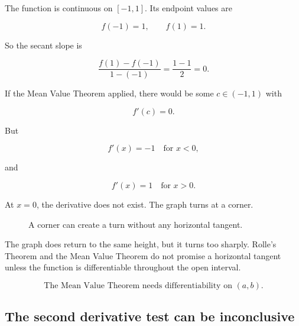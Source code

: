 The function is continuous on \([-1,1]\).  Its endpoint values are

\[
f(-1)=1,
\qquad
f(1)=1.
\]

So the secant slope is

\[
\frac{f(1)-f(-1)}{1-(-1)}
=
\frac{1-1}{2}
=
0.
\]

If the Mean Value Theorem applied, there would be some \(c\in(-1,1)\) with

\[
f'(c)=0.
\]

But

\[
f'(x)=-1
\quad\text{for }x<0,
\]

and

\[
f'(x)=1
\quad\text{for }x>0.
\]

At \(x=0\), the derivative does not exist.  The graph turns at a corner.

\begin{figure}[h]
\centering
{}
\caption{A corner can create a turn without any horizontal tangent.}
\label{fig:mvt-differentiability-warning}
\end{figure}

The graph does return to the same height, but it turns too sharply.  Rolle's Theorem
and the Mean Value Theorem do not promise a horizontal tangent unless the function
is differentiable throughout the open interval.

\[
\boxed{
\text{The Mean Value Theorem needs differentiability on }(a,b).
}
\]

\subsection{The second derivative test can be inconclusive}
\label{subsec:second-derivative-inconclusive-warning}

